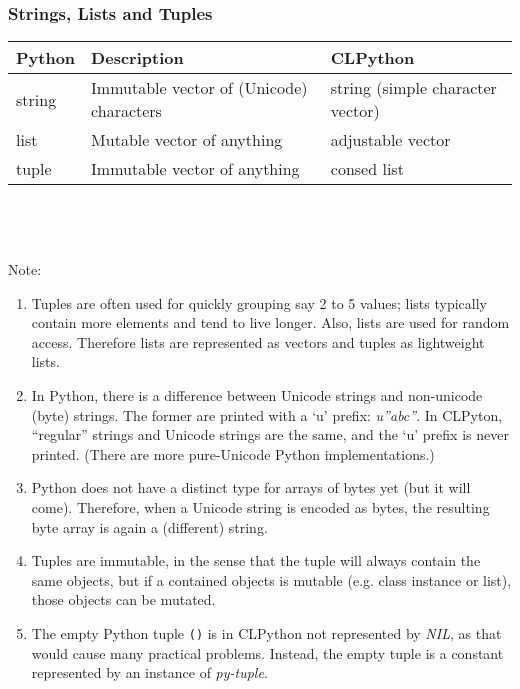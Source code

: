 \documentclass{article}
\begin{document}
\subsubsection{Strings, Lists and Tuples}
\begin{tabular}{lll}
 Python & Description & CLPython \\
\hline
 string & Immutable vector of (Unicode) characters & string (simple character vector) \\
 list   & Mutable vector of anything & adjustable vector \\
 tuple  & Immutable vector of anything & consed list
\end{tabular} \\
\\ \\
Note:
\begin{enumerate}

 \item{} Tuples are often used for quickly grouping say 2 to 5 values;
         lists typically contain more elements and tend to live
         longer. Also, lists are used for random access. Therefore
         lists are represented as vectors and tuples as lightweight lists.

 \item{} In Python, there is a difference between Unicode strings and
          non-unicode (byte) strings. The former are printed with a
          `u' prefix: {\em u''abc''}. In CLPyton, ``regular'' strings
          and Unicode strings are the same, and the `u' prefix is
          never printed. (There are more pure-Unicode Python
          implementations.)

 \item{} Python does not have a distinct type for arrays of bytes yet
         (but it will come). Therefore, when a Unicode string is
         encoded as bytes, the resulting byte array is again a
         (different) string.

 \item{} Tuples are immutable, in the sense that the tuple will always
          contain the same objects, but if a contained objects is
          mutable (e.g. class instance or list), those objects can be
          mutated.

 \item{} The empty Python tuple {\tt ()} is in CLPython not represented by {\em
          NIL}, as that would cause many practical problems. Instead,
          the empty tuple is a constant represented by an instance of {\em py-tuple}.
\end{enumerate}
\end{document}
